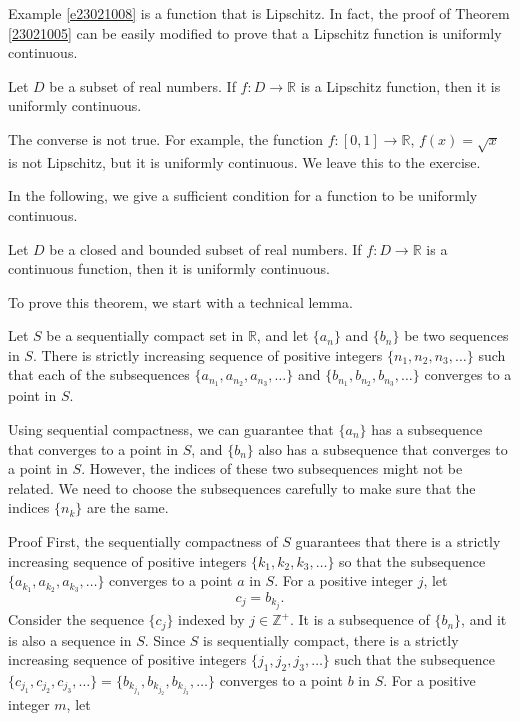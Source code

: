 \begin{example}
Example \ref{e23021008} is a function that is Lipschitz. In fact, 
the proof of Theorem \ref{23021005} can be easily modified to prove that a Lipschitz function is uniformly continuous.
 \begin{theorem}[label=23021006]{}
Let $D$ be a subset of real numbers. If $f:D\rightarrow\mathbb{R}$ is a Lipschitz function, then it is uniformly continuous.
\end{theorem}

The converse is not true. For example, the function $f:[0,1]\rightarrow\mathbb{R}$, $f(x)=\sqrt{x}$ is not Lipschitz, but it is uniformly continuous. We leave this to the exercise. 


In the following, we give a sufficient condition for a function to be uniformly continuous. 
\begin{theorem}[label=23021008]{}
Let $D$ be a closed and bounded subset of real numbers. If $f:D\rightarrow\mathbb{R}$ is a continuous function, then it is uniformly continuous.
\end{theorem}
To prove this theorem, we start with a technical lemma.
\begin{lemma}[label=23021009]{}
Let $S$ be a sequentially compact set in $\mathbb{R}$, and let $\{a_n\}$ and $\{b_n\}$ be two sequences in $S$. There is strictly increasing sequence of positive integers $\{n_1, n_2, n_3,  \ldots\}$ such that each of 
 the subsequences  $\{a_{n_1}, a_{n_2}, a_{n_3}, \ldots\}$     and 
  $\{b_{n_1}, b_{n_2}, b_{n_3}, \ldots\}$    converges to a point in $S$.
\end{lemma}
Using sequential compactness, we can guarantee that $\{a_n\}$ has a subsequence  that converges to a point in $S$, and $\{b_n\}$ also has a subsequence that converges to a point in $S$. However, the indices of these two subsequences might not be related. We need to choose the subsequences carefully to make sure that the indices $\{n_k\}$ are the same. 
\begin{myproof}{Proof}
First, the sequentially compactness of $S$ guarantees that there is a strictly increasing sequence of positive integers  $\{k_1, k_2, k_3, \ldots\}$  so that the subsequence $\{a_{k_1}, a_{k_2}, a_{k_3}, \ldots\}$  converges to a point $a$ in $S$. For a positive integer $j$, let   
\[c_j=b_{k_j}.\] Consider the sequence $\{c_j\}$ indexed by $j\in\mathbb{Z}^+$. It is a subsequence of $\{b_n\}$, and it is also a sequence in $S$.  Since $S$ is sequentially compact, there is a strictly increasing sequence of positive  integers $\{j_1, j_2, j_3, \ldots\}$  such that the subsequence $\{c_{j_1}, c_{j_2}, c_{j_3}, \ldots\}=\{b_{k_{j_1}}, b_{k_{j_2}}, b_{k_{j_3}}, \ldots\}$ converges to a point $b$ in $S$. For a positive integer $m$, let

\end{myproof}
\end{example}
